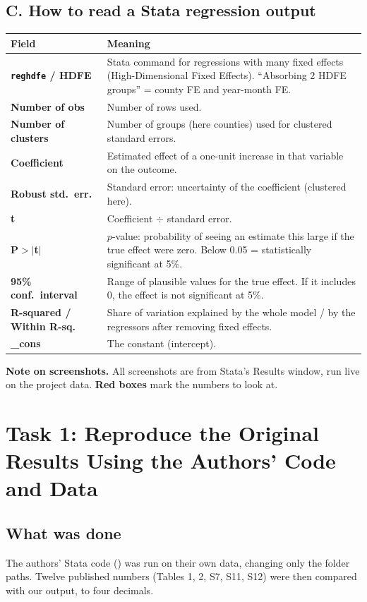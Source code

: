 \documentclass[11pt]{article}
\begin{document}
\subsection*{C. How to read a Stata regression output}
\begin{table}[H]\centering\small
\begin{tabularx}{\linewidth}{>{\bfseries}l>{\raggedright\arraybackslash}X}
\toprule
Field & Meaning\\
\midrule
\texttt{reghdfe} / HDFE & Stata command for regressions with many fixed effects (High-Dimensional Fixed Effects). ``Absorbing 2 HDFE groups'' = county FE and year-month FE.\\
Number of obs & Number of rows used.\\
Number of clusters & Number of groups (here counties) used for clustered standard errors.\\
Coefficient & Estimated effect of a one-unit increase in that variable on the outcome.\\
Robust std.\ err. & Standard error: uncertainty of the coefficient (clustered here).\\
t & Coefficient $\div$ standard error.\\
P$>|$t$|$ & $p$-value: probability of seeing an estimate this large if the true effect were zero. Below 0.05 = statistically significant at 5\%.\\
95\% conf.\ interval & Range of plausible values for the true effect. If it includes 0, the effect is not significant at 5\%.\\
R-squared / Within R-sq. & Share of variation explained by the whole model / by the regressors after removing fixed effects.\\
\_cons & The constant (intercept).\\
\bottomrule
\end{tabularx}
\end{table}

\noindent\textbf{Note on screenshots.} All screenshots are from Stata's Results window, run live on the project data. \textcolor{red!70!black}{\textbf{Red boxes}} mark the numbers to look at.

\section{Task 1: Reproduce the Original Results Using the Authors' Code and Data}

\subsection*{What was done}
The authors' Stata code () was run on their own data, changing only the folder paths. Twelve published numbers (Tables 1, 2, S7, S11, S12) were then compared with our output, to four decimals.
\end{document}

